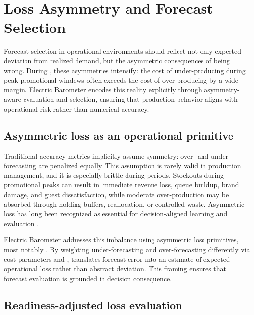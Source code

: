 
\section{Loss Asymmetry and Forecast Selection}
\label{sec:asymmetry}

Forecast selection in operational environments should reflect not only expected deviation from
realized demand, but the asymmetric consequences of being wrong. During \LTOs{}, these asymmetries
intensify: the cost of under-producing during peak promotional windows often exceeds the cost of
over-producing by a wide margin. Electric Barometer encodes this reality explicitly through
asymmetry-aware evaluation and selection, ensuring that production behavior aligns with operational
risk rather than numerical accuracy.

\subsection{Asymmetric loss as an operational primitive}
\label{subsec:asymmetric-loss}

Traditional accuracy metrics implicitly assume symmetry: over- and under-forecasting are penalized
equally. This assumption is rarely valid in production management, and it is especially brittle
during \LTO{} periods. Stockouts during promotional peaks can result in immediate revenue loss,
queue buildup, brand damage, and guest dissatisfaction, while moderate over-production may be
absorbed through holding buffers, reallocation, or controlled waste. Asymmetric loss has long been
recognized as essential for decision-aligned learning and evaluation \citep{elkan2001}.

Electric Barometer addresses this imbalance using asymmetric loss primitives, most notably
\CWSL{}. By weighting under-forecasting and over-forecasting differently via cost parameters
\cu{} and \co{}, \CWSL{} translates forecast error into an estimate of expected operational loss
rather than abstract deviation. This framing ensures that forecast evaluation is grounded in
decision consequence.

\subsection{Readiness-adjusted loss evaluation}
\label{subsec:readiness-adjusted-loss}

